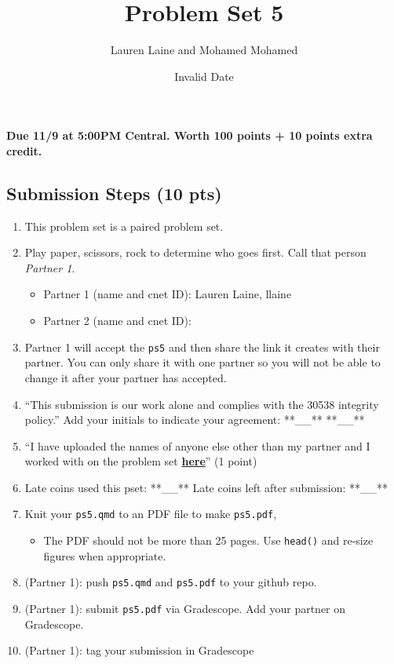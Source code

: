 \documentclass[
  letterpaper,
  DIV=11,
  numbers=noendperiod]{scrartcl}
\title{Problem Set 5}
\author{Lauren Laine and Mohamed Mohamed}
\date{Invalid Date}
\providecommand{\tightlist}{%
  \setlength{\itemsep}{0pt}\setlength{\parskip}{0pt}}\usepackage{longtable,booktabs,array}
\begin{document}
\maketitle



\textbf{Due 11/9 at 5:00PM Central. Worth 100 points + 10 points extra
credit.}

\subsection{Submission Steps (10 pts)}\label{submission-steps-10-pts}

\begin{enumerate}
\def\labelenumi{\arabic{enumi}.}
\tightlist
\item
  This problem set is a paired problem set.
\item
  Play paper, scissors, rock to determine who goes first. Call that
  person \emph{Partner 1}.

  \begin{itemize}
  \tightlist
  \item
    Partner 1 (name and cnet ID): Lauren Laine, llaine
  \item
    Partner 2 (name and cnet ID):
  \end{itemize}
\item
  Partner 1 will accept the \texttt{ps5} and then share the link it
  creates with their partner. You can only share it with one partner so
  you will not be able to change it after your partner has accepted.
\item
  ``This submission is our work alone and complies with the 30538
  integrity policy.'' Add your initials to indicate your agreement:
  **\_\_** **\_\_**
\item
  ``I have uploaded the names of anyone else other than my partner and I
  worked with on the problem set
  \textbf{\href{https://docs.google.com/forms/d/185usrCREQaUbvAXpWhChkjghdGgmAZXA3lPWpXLLsts/edit}{here}}''
  (1 point)
\item
  Late coins used this pset: **\_\_** Late coins left after submission:
  **\_\_**
\item
  Knit your \texttt{ps5.qmd} to an PDF file to make \texttt{ps5.pdf},

  \begin{itemize}
  \tightlist
  \item
    The PDF should not be more than 25 pages. Use \texttt{head()} and
    re-size figures when appropriate.
  \end{itemize}
\item
  (Partner 1): push \texttt{ps5.qmd} and \texttt{ps5.pdf} to your github
  repo.
\item
  (Partner 1): submit \texttt{ps5.pdf} via Gradescope. Add your partner
  on Gradescope.
\item
  (Partner 1): tag your submission in Gradescope
\end{enumerate}
\end{document}
